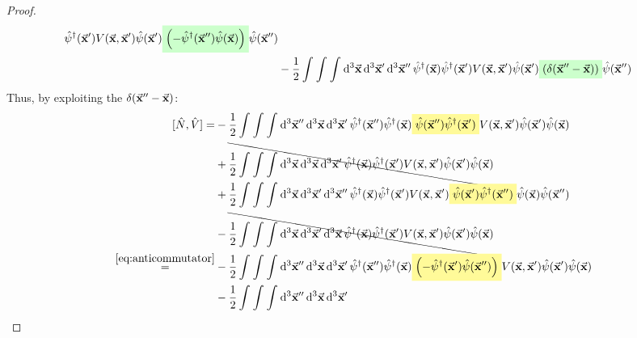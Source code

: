 \documentclass[11pt, a4paper, twoside, openright]{article}
\begin{document}
\begin{proof}
\begin{equation*}
\begin{split}
    \hat{\psi } ^\dag (\va{x}') V (\va{x},\va{x}') \hat{\psi } (\va{x}') \mathcolorbox{green!20}{ \qty(-   \hat{\psi }^\dag (\va{x}'') \hat{\psi } (\va{x})  )} \hat{\psi }(\va{x}'') \\
    &-
    \frac{1}{2} \int_{}^{} \int_{}^{} \int_{}^{} \dd[3]{\va{x}} \dd[3]{\va{x}'} \dd[3]{\va{x}''}
    \hat{\psi } ^\dag (\va{x})
    \hat{\psi } ^\dag (\va{x}') V (\va{x},\va{x}') \hat{\psi } (\va{x}') \mathcolorbox{green!20}{ \qty( \delta (\va{x}''-\va{x}))} \hat{\psi }(\va{x}'')
\end{split}
\end{equation*}
Thus, by exploiting the \( \delta (\va{x}''-\va{x}) \):
\begin{equation*}
\begin{split}
  [\hat{N},\hat{V}  ] =&
      - \frac{1}{2} \int_{}^{} \int_{}^{} \int_{}^{} \dd[3]{\va{x}''} \dd[3]{\va{x}}  \dd[3]{\va{x}'}
      \hat{\psi }^\dag (\va{x}'')   \hat{\psi } ^\dag (\va{x}) \mathcolorbox{yellow!40}{\hat{\psi }(\va{x}'')
      \hat{\psi } ^\dag (\va{x}')} V (\va{x},\va{x}') \hat{\psi } (\va{x}') \hat{\psi } (\va{x}) \\
      &+
      \bcancel{
      \frac{1}{2} \int_{}^{} \int_{}^{} \int_{}^{} \dd[3]{\va{x}} \dd[3]{\va{x}}  \dd[3]{\va{x}'}
      \hat{\psi }^\dag (\va{x})
      \hat{\psi } ^\dag (\va{x}') V (\va{x},\va{x}') \hat{\psi } (\va{x}') \hat{\psi } (\va{x})
      } \\
      &+
      \frac{1}{2} \int_{}^{} \int_{}^{} \int_{}^{} \dd[3]{\va{x}} \dd[3]{\va{x}'} \dd[3]{\va{x}''}
      \hat{\psi } ^\dag (\va{x})
      \hat{\psi } ^\dag (\va{x}') V (\va{x},\va{x}') \mathcolorbox{yellow!40}{\hat{\psi } (\va{x}')   \hat{\psi }^\dag (\va{x}'') } \hat{\psi } (\va{x}) \hat{\psi }(\va{x}'') \\
      &-
      \bcancel{
      \frac{1}{2} \int_{}^{} \int_{}^{} \int_{}^{} \dd[3]{\va{x}} \dd[3]{\va{x}'} \dd[3]{\va{x}}
      \hat{\psi } ^\dag (\va{x})
      \hat{\psi } ^\dag (\va{x}') V (\va{x},\va{x}') \hat{\psi } (\va{x}')  \hat{\psi }(\va{x})
      } \\
      \overset{\eqref{eq:anticommutator}}{=} &
      - \frac{1}{2} \int_{}^{} \int_{}^{} \int_{}^{} \dd[3]{\va{x}''} \dd[3]{\va{x}}  \dd[3]{\va{x}'}
      \hat{\psi }^\dag (\va{x}'')   \hat{\psi } ^\dag (\va{x}) \mathcolorbox{yellow!40}{ \qty( - \hat{\psi } ^\dag (\va{x}')  \hat{\psi }(\va{x}'') )} V (\va{x},\va{x}') \hat{\psi } (\va{x}') \hat{\psi } (\va{x}) \\
      &-
      \frac{1}{2} \int_{}^{} \int_{}^{} \int_{}^{} \dd[3]{\va{x}''} \dd[3]{\va{x}}  \dd[3]{\va{x}'}

\end{split}
\end{equation*}
\end{proof}
\end{document}
